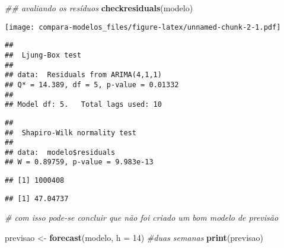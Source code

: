 \documentclass[
]{article}
\newenvironment{Shaded}{\begin{snugshade}}{\end{snugshade}}
\newcommand{\CommentTok}[1]{\textcolor[rgb]{0.56,0.35,0.01}{\textit{#1}}}
\newcommand{\DataTypeTok}[1]{\textcolor[rgb]{0.13,0.29,0.53}{#1}}
\newcommand{\DecValTok}[1]{\textcolor[rgb]{0.00,0.00,0.81}{#1}}
\newcommand{\KeywordTok}[1]{\textcolor[rgb]{0.13,0.29,0.53}{\textbf{#1}}}
\newcommand{\NormalTok}[1]{#1}
\newcommand{\OperatorTok}[1]{\textcolor[rgb]{0.81,0.36,0.00}{\textbf{#1}}}
\newcommand{\StringTok}[1]{\textcolor[rgb]{0.31,0.60,0.02}{#1}}
\begin{document}
\begin{Shaded}
\begin{Highlighting}[]
\CommentTok{## avaliando os resíduos}
\KeywordTok{checkresiduals}\NormalTok{(modelo) }
\end{Highlighting}
\end{Shaded}

\texttt{[image: compara-modelos\_files/figure-latex/unnamed-chunk-2-1.pdf]}

\begin{verbatim}
## 
##  Ljung-Box test
## 
## data:  Residuals from ARIMA(4,1,1)
## Q* = 14.389, df = 5, p-value = 0.01332
## 
## Model df: 5.   Total lags used: 10
\end{verbatim}

\begin{Shaded}
\end{Shaded}

\begin{verbatim}
## 
##  Shapiro-Wilk normality test
## 
## data:  modelo$residuals
## W = 0.89759, p-value = 9.983e-13
\end{verbatim}

\begin{Shaded}
\end{Shaded}

\begin{verbatim}
## [1] 1000408
\end{verbatim}

\begin{Shaded}
\end{Shaded}

\begin{verbatim}
## [1] 47.04737
\end{verbatim}

\begin{Shaded}
\begin{Highlighting}[]
\CommentTok{# com isso pode-se concluir que não foi criado um bom modelo de previsão }

\NormalTok{previsao <-}\StringTok{ }\KeywordTok{forecast}\NormalTok{(modelo, }\DataTypeTok{h =} \DecValTok{14}\NormalTok{) }\CommentTok{#duas semanas}
\KeywordTok{print}\NormalTok{(previsao)}
\end{Highlighting}
\end{Shaded}
\end{document}
